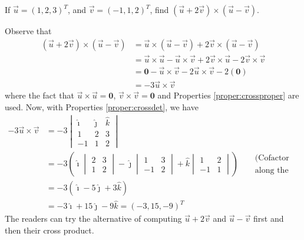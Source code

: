 \begin{exmp}
If $\vec{u} = (1,2,3)^T$, and $\vec{v} = (-1,1,2)^T$, find $(\vec{u} + 2\vec{v}) \times (\vec{u} - \vec{v}) $.
\end{exmp}
\begin{solution}
Observe that
\begin{align*}
(\vec{u} + 2\vec{v}) \times (\vec{u} - \vec{v}) &= \vec{u} \times (\vec{u} - \vec{v}) + 2\vec{v} \times (\vec{u} - \vec{v}) \\
&= \vec{u} \times \vec{u} - \vec{u} \times \vec{v} + 2\vec{v} \times \vec{u} - 2\vec{v} \times \vec{v} \\
&= \textbf{0} - \vec{u} \times \vec{v} - 2\vec{u} \times \vec{v} - 2(\textbf{0}) \\
&= -3\vec{u} \times \vec{v}
\end{align*}
where the fact that $\vec{u} \times \vec{u} = \textbf{0}$, $\vec{v} \times \vec{v} = \textbf{0}$ and Properties \ref{proper:crossproper} are used. Now, with Properties \ref{proper:crossdet}, we have
\begin{align*}
-3\vec{u} \times \vec{v} &=  
-3
\begin{vmatrix}
\hat{\imath} & \hat{\jmath} & \hat{k} \\
1 & 2 & 3 \\
-1 & 1 & 2
\end{vmatrix} \\
&= -3\left(\hat{\imath}
\begin{vmatrix}
2 & 3 \\
1 & 2 
\end{vmatrix}
- \hat{\jmath}
\begin{vmatrix}
1 & 3 \\
-1 & 2
\end{vmatrix}
+ \hat{k}
\begin{vmatrix}
1 & 2 \\
-1 & 1 
\end{vmatrix}\right) & \begin{aligned}
&\text{(Cofactor expansion} \\ 
&\text{along the first row)}
\end{aligned} \\
&= -3(\hat{\imath}-5\hat{\jmath}+3\hat{k}) \\
&= -3\hat{\imath}+15\hat{\jmath}-9\hat{k} = (-3,15,-9)^T
\end{align*}
The readers can try the alternative of computing $\vec{u}+2\vec{v}$ and $\vec{u} - \vec{v}$ first and then their cross product.
\end{solution}

